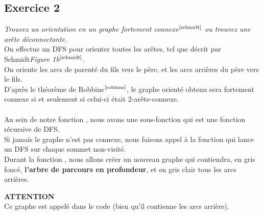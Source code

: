 \documentclass{article}      %
\begin{document}
\subsection{Exercice 2}
\textit{\textcolor{exogris}{
Trouvez un orientation en un graphe fortement connexe$^\text{\cite{schmidt}}$ ou trouvez une arête déconnectante.
}}
\\On effectue un DFS pour orienter toutes les arêtes, tel que décrit par Schmidt\textit{Figure 1b}$^\text{\cite{schmidt}}$.
\\On oriente les arcs de parenté du fils vers le père, et les arcs arrières du père vers le fils.
\\D'après le théorème de Robbins$^\text{\cite{robbins}}$, le graphe orienté obtenu sera fortement connexe si et seulement si celui-ci était 2-arête-connexe.
\\\\Au sein de notre fonction , nous avons une sous-fonction  qui est une fonction récursive de DFS.
\\Si jamais le graphe n'est pas connexe, nous faisons appel à la fonction  qui lance un DFS sur chaque sommet non-visité.
\\Durant la fonction , nous allons créer un nouveau graphe qui contiendra, en \textcolor[HTML]{333333}{gris foncé}, \textbf{l'arbre de parcours en profondeur}, et en \textcolor[HTML]{a0a0a0}{gris clair} tous les arcs arrières.
\begin{danger}
{ \scriptsize \textcolor{danger}{ \textbf{ATTENTION}}}
\vspace{3px}
\\ Ce graphe est appelé  dans le code (bien qu'il contienne les arcs arrière).
\end{danger}

\begin{figure}[H]
    \centering
    \\
\end{figure}
\end{document}
